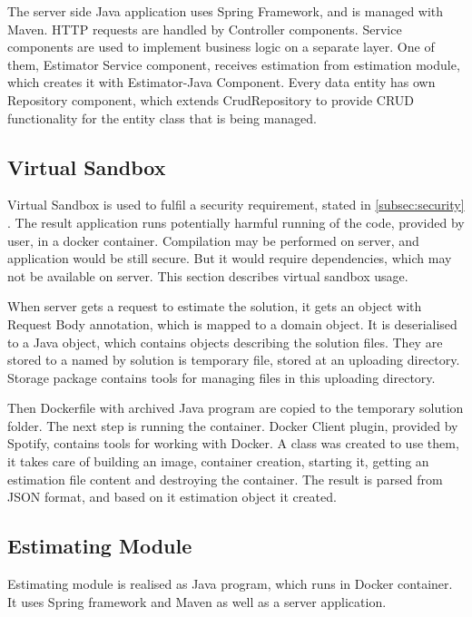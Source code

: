     The server side Java application uses Spring Framework, and is managed with Maven. HTTP requests are handled by Controller components. Service components are used to implement business logic on a separate layer. One of them, Estimator Service component, receives estimation from estimation module, which creates it with Estimator-Java Component. Every data entity has own Repository component, which extends CrudRepository to provide CRUD functionality for the entity class that is being managed.
    
        \subsection{Virtual Sandbox}
        Virtual Sandbox is used to fulfil a security requirement, stated in \ref{subsec:security} . The result application runs potentially harmful running of the code, provided by user, in a docker container. Compilation may be performed on server, and application would be still secure. But it would require dependencies, which may not be available on server. This section describes virtual sandbox usage.
        
        When server gets a request to estimate the solution, it gets an object with Request Body annotation, which is mapped to a domain object. It is deserialised to a Java object, which contains objects describing the solution files. They are stored to a named by solution is temporary file, stored at an uploading directory. Storage package contains tools for managing files in this uploading directory.
        
        Then Dockerfile with archived Java program are copied to the temporary solution folder. The next step is running the container. Docker Client plugin, provided by Spotify, contains tools for working with Docker. A class was created to use them, it takes care of building an image, container creation, starting it, getting an estimation file content and destroying the container. The result is parsed from JSON format, and based on it estimation object it created.
        
        
        \subsection{Estimating Module}
        Estimating module is realised as Java program, which runs in Docker container. It uses Spring framework and Maven as well as a server application.
        
